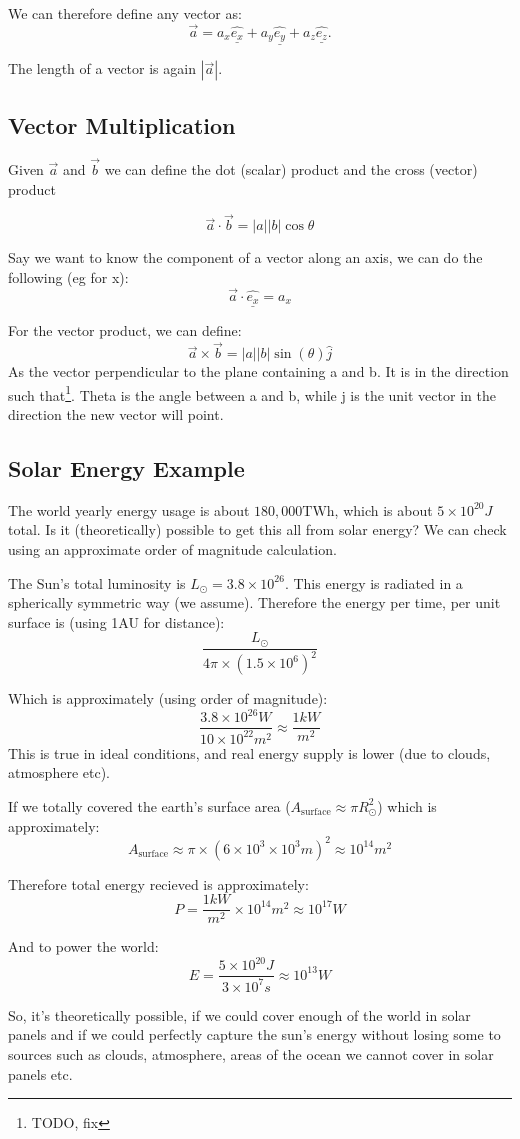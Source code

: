We can therefore define any vector as:
\[
    \vec{a} = a_x \underline{\hat{e_x}} + a_y \underline{\hat{e_y}} + a_z\underline{\hat{e_z}}.
\]

The length of a vector is again $|\vec{a}|$.

\subsection*{Vector Multiplication}
Given $\vec{a}$ and $\vec{b}$ we can define the dot (scalar) product and the cross (vector) product

\[
    \vec{a} \cdot \vec{b} = |a||b| \cos \theta
\]

Say we want to know the component of a vector along an axis, we can do the following (eg for x):
\[
    \vec{a} \cdot \underline{\hat{e_x}} = a_x
\]

For the vector product, we can define:
\[
    \vec{a} \times \vec{b} = |a||b| \sin(\theta) \hat{j}
\]
As the vector perpendicular to the plane containing a and b. It is in the direction such that\footnote{TODO, fix}. Theta is the angle between a and b, while j is the unit vector in the direction the new vector will point.

\subsection*{Solar Energy Example}
The world yearly energy usage is about $180,000 \text{TWh}$, which is about $5 \times 10^{20}J$ total. Is it (theoretically) possible to get this all from solar energy? We can check using an approximate order of magnitude calculation.

The Sun's total luminosity is $L_{\odot} = 3.8 \times 10^{26}$. This energy is radiated in a spherically symmetric way (we assume). Therefore the energy per time, per unit surface is (using 1AU for distance):
\[
    \frac{L_{\odot}}{4\pi \times (1.5 \times 10^6)^2}
\]

Which is approximately (using order of magnitude):
\[
    \frac{3.8 \times 10^{26}W}{10 \times 10^{22}m^2} \approx \frac{1kW}{m^2}
\]
This is true in ideal conditions, and real energy supply is lower (due to clouds, atmosphere etc). 

If we totally covered the earth's surface area ($A_{\text{surface}} \approx \pi R_{\odot}^2$) which is approximately:
\[
    A_{\text{surface}} \approx \pi \times (6\times10^3\times10^3m)^2 \approx 10^{14}m^2
\]

Therefore total energy recieved is approximately:
\[
    P = \frac{1kW}{m^2} \times 10^{14}m^2 \approx 10^{17}W
\]

And to power the world:
\[
    E = \frac{5 \times 10^{20}J}{3 \times 10^7s} \approx 10^{13}W
\]

So, it's theoretically possible, if we could cover enough of the world in solar panels and if we could perfectly capture the sun's energy without losing some to sources such as clouds, atmosphere, areas of the ocean we cannot cover in solar panels etc.

